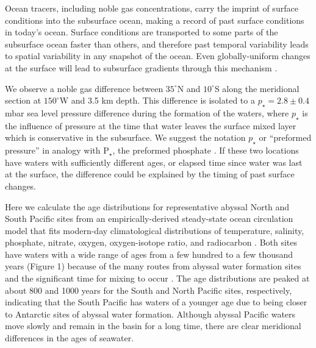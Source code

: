 \documentclass[12pt]{article}
\begin{document}
Ocean tracers, including noble gas concentrations, carry the imprint
of surface conditions into the subsurface ocean, making a record of
past surface conditions in today's ocean. Surface conditions are
transported to some parts of the subsurface ocean faster than others,
and therefore past temporal variability leads to spatial variability
in any snapshot of the ocean. Even globally-uniform changes at the
surface will lead to subsurface gradients through this mechanism
\cite{Scheen-Stocker-2020:Effect,Gebbie-Huybers-2019:Little}.

We observe a noble gas difference between $35^{\circ}$N and
$10^{\circ}$S along the meridional section at $150^{\circ}$W and 3.5
km depth. This difference is isolated to a $p_{\star}=2.8 \pm 0.4$
mbar sea level pressure difference during the formation of the waters,
where $p_{\star}$ is the influence of pressure at the time that water
leaves the surface mixed layer which is conservative in the
subsurface. We suggest the notation $p_{\star}$ or ``preformed
pressure'' in analogy with $\mathrm{P}_{\star}$, the preformed phosphate
\cite{IOC-2010:TEOS}. If these two locations have waters with
sufficiently different ages, or elapsed time since water was last at
the surface, the difference could be explained by the timing of past
surface changes.

Here we calculate the age distributions for representative abyssal
North and South Pacific sites from an empirically-derived steady-state
ocean circulation model that fits modern-day climatological
distributions of temperature, salinity, phosphate, nitrate, oxygen,
oxygen-isotope ratio, and radiocarbon
\cite{Gebbie-Huybers-2012:mean}. Both sites have waters with a wide
range of ages from a few hundred to a few thousand years (Figure 1)
because of the many routes from abyssal water formation sites and the
significant time for mixing to occur
\cite{Khatiwala-Visbeck-2001:Age}. The age distributions are peaked at
about 800 and 1000 years for the South and North Pacific sites,
respectively, indicating that the South Pacific has waters of a
younger age due to being closer to Antarctic sites of abyssal water
formation. Although abyssal Pacific waters move slowly and remain in
the basin for a long time, there are clear meridional differences in
the ages of seawater.
 
\end{document}
